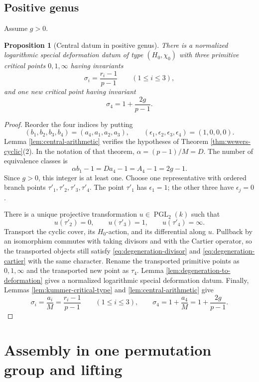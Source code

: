\documentclass[11pt]{amsart}
\theoremstyle{plain}
\newtheorem{proposition}[theorem]{Proposition}
\theoremstyle{definition}
\numberwithin{equation}{section}
\begin{document}
\subsection{Positive genus}
Assume $g>0$.

\begin{proposition}[Central datum in positive genus]
\label{prop:central-positive-genus}
There is a normalized logarithmic special deformation datum of type
$(H_0,\chi_0)$ with three primitive critical points $0,1,\infty$ having
invariants
\[
 \sigma_i=\frac{r_i-1}{p-1}\qquad(1\leq i\leq3),
\]
and one new critical point having invariant
\[
 \sigma_4=1+\frac{2g}{p-1}.
\]
\end{proposition}

\begin{proof}
Reorder the four indices by putting
\[
 (b_1,b_2,b_3,b_4)=(a_4,a_1,a_2,a_3),\qquad
 (\epsilon_1,\epsilon_2,\epsilon_3,\epsilon_4)=(1,0,0,0).
\]
Lemma \ref{lem:central-arithmetic} verifies the hypotheses of Theorem
\ref{thm:wewers-cyclic}(2).  In the notation of that theorem,
$\alpha=(p-1)/M=D$.  The number of equivalence classes is
\[
 \alpha b_1-1=Da_4-1=A_4-1=2g-1.
\]
Since $g>0$, this integer is at least one.  Choose one representative with
ordered branch points
$\tau'_1,\tau'_2,\tau'_3,\tau'_4$.  The point $\tau'_1$ has
$\epsilon_1=1$; the other three have $\epsilon_j=0$.

There is a unique projective transformation $u\in\operatorname{PGL}_2(k)$
such that
\[
 u(\tau'_2)=0,\qquad u(\tau'_3)=1,\qquad
 u(\tau'_4)=\infty.
\]
Transport the cyclic cover, its $H_0$-action, and its differential along
$u$.  Pullback by an isomorphism commutes with taking divisors and with the
Cartier operator, so the transported objects still satisfy
\eqref{eq:degeneration-divisor} and \eqref{eq:degeneration-cartier} with
the same character.  Rename the transported primitive points as
$0,1,\infty$ and the transported new point as $\tau_4$.  Lemma
\ref{lem:degeneration-to-deformation} gives a normalized logarithmic special
deformation datum.  Finally, Lemmas \ref{lem:kummer-critical-type} and
\ref{lem:central-arithmetic} give
\[
 \sigma_i=\frac{a_i}{M}=\frac{r_i-1}{p-1}\qquad(1\leq i\leq3),
 \qquad
 \sigma_4=1+\frac{a_4}{M}=1+\frac{2g}{p-1}.
\]
\end{proof}

\section{Assembly in one permutation group and lifting}
\label{sec:assembly}
\end{document}
